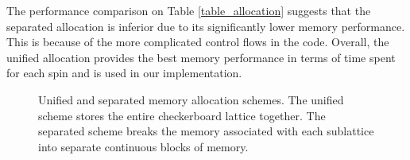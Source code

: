 The performance comparison on Table \ref{table_allocation} suggests that the
separated allocation is inferior due to its significantly lower memory
performance. This is because of the more complicated control flows in
the code. 
Overall, the unified allocation provides the best memory performance
in terms of time spent for each spin and is used in our
implementation.

\begin{figure}[!h]
  \centering
\hspace{1.4cm}
  \caption{Unified and separated memory allocation schemes.  The unified scheme stores the entire checkerboard
  lattice together. The separated scheme breaks the memory associated with each sublattice into
  separate continuous blocks of memory.}
\label{fig_alloc12}
\end{figure}



